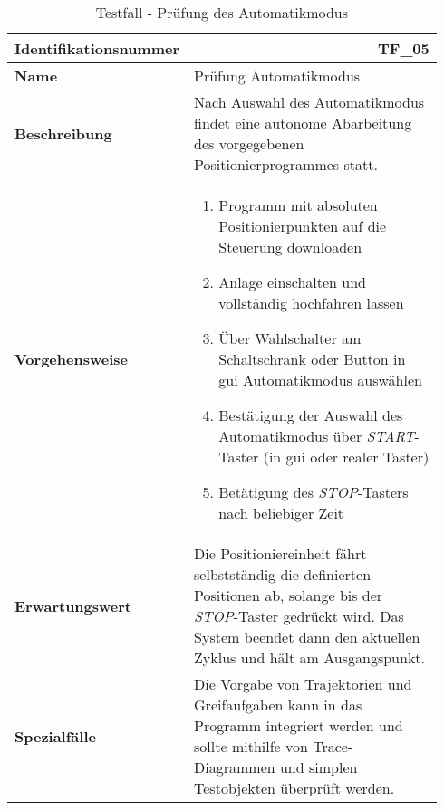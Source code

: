\documentclass[../../../Bachelorarbeit.tex]{subfiles}
\begin{document}
\begin{table}[H]
    \centering
    \begin{tabular}{ p{0.34\linewidth}  p{0.6\linewidth} }
        \hline
        \textbf{Identifikationsnummer}  & \multicolumn{1}{r}{TF\_05} \\ \hline
        \textbf{Name}                   & Prüfung Automatikmodus \\
        \textbf{Beschreibung}           & Nach Auswahl des Automatikmodus findet eine autonome Abarbeitung des vorgegebenen Positionierprogrammes statt. \\
        \textbf{Vorgehensweise}         &   {\begin{enumerate}[noitemsep,topsep=0pt,parsep=0pt,partopsep=0pt,leftmargin=*]
                                                \item Programm mit absoluten Positionierpunkten auf die Steuerung downloaden
                                                \item Anlage einschalten und vollständig hochfahren lassen
                                                \item Über Wahlschalter am Schaltschrank oder Button in \acs{gui} Automatikmodus auswählen
                                                \item Bestätigung der Auswahl des Automatikmodus über \textit{START}-Taster (in \acs{gui} oder realer Taster)
                                                \item Betätigung des \textit{STOP}-Tasters nach beliebiger Zeit
                                            \end{enumerate}} \\
        \textbf{Erwartungswert}         & Die Positioniereinheit fährt selbstständig die definierten Positionen ab, solange bis der \textit{STOP}-Taster gedrückt wird. Das System beendet dann den aktuellen Zyklus und hält am Ausgangspunkt. \\
        \textbf{Spezialfälle}           & Die Vorgabe von Trajektorien und Greifaufgaben kann in das Programm integriert werden und sollte mithilfe von Trace-Diagrammen und simplen Testobjekten überprüft werden. \\ \hline
    \end{tabular}
    \caption[\acs{tf} - Automatikmodus]{Testfall - Prüfung des Automatikmodus}
    \label{tab:my-table64}
\end{table}
\end{document}
